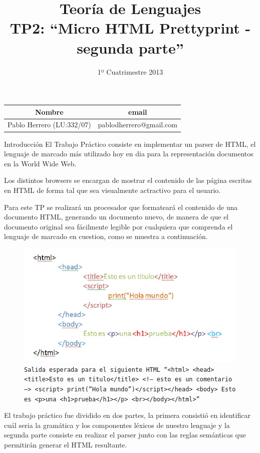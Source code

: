 \documentclass[a4paper,8pt]{article}
\title{Teoría de Lenguajes\\ \textbf{TP2: “Micro HTML Prettyprint - segunda parte”}}
\author{1º Cuatrimestre 2013}
\date{}
\begin{document}
\maketitle

\begin{center}
\vspace{10cm}

\begin{tabular}{|c|c|}
\hline
\hline
\textbf{Nombre}&\textbf{email}\\
\hline
\hline
Pablo Herrero (LU:332/07)   & pablodherrero@gmail.com   \\
\hline
\hline
\end{tabular}
\end{center}

\newpage

\begin{section}{Introducción}
El Trabajo Práctico consiste en implementar un parser de HTML, el lenguaje de marcado más utilizado hoy en dia para la representación documentos en la World Wide Web.

Los distintos browsers se encargan de mostrar el contenido de las página escritas en HTML de forma tal que sea visualmente actractivo para el usuario.

Para este TP se realizará un procesador que formateará el contenido de una documento HTML, generando un documento nuevo, de manera de que el documento original sea fácilmente legible por cualquiera que comprenda el lenguaje de marcado en cuestion, como se muestra a continuación.

\begin{figure}[h!]
  \centering
  \includegraphics[scale=0.70]{salida.png}
  \caption{\texttt{Salida esperada para el siguiente HTML ``$<html> <head><title>$Esto es un titulo$</title> <!–$ esto es un comentario $–> <script> print($”Hola mundo”$)</script></head> <body>$ Esto es $<p>$una $<h1>$prueba$</h1></p> <br></body></html>$''}}
\end{figure}

El trabajo práctico fue dividido en dos partes, la primera consistió en identificar cuál seria la gramática y los componentes léxicos de nuestro lenguaje y la segunda parte consiste en realizar el parser junto con las reglas semánticas que permitirán generar el HTML resultante.
 


\end{section}
\end{document}

